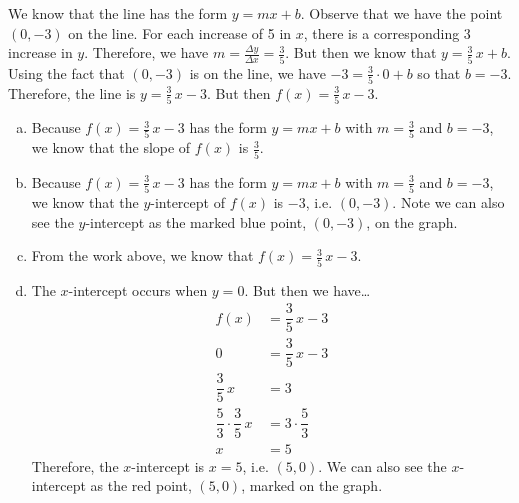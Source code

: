 \documentclass[11pt,letterpaper]{article}
\begin{document}
\sol We know that the line has the form $y= mx + b$. Observe that we have the point $(0, -3)$ on the line. For each increase of 5 in $x$, there is a corresponding 3 increase in $y$. Therefore, we have $m= \frac{\Delta y}{\Delta x}= \frac{3}{5}$. But then we know that $y= \frac{3}{5}\,x + b$. Using the fact that $(0, -3)$ is on the line, we have $-3= \frac{3}{5} \cdot 0 + b$ so that $b= -3$. Therefore, the line is $y= \frac{3}{5}\,x - 3$. But then $f(x)= \frac{3}{5}\,x - 3$. 

\begin{enumerate}[(a)]
\item  Because $f(x)= \frac{3}{5}\,x - 3$ has the form $y= mx + b$ with $m= \frac{3}{5}$ and $b= -3$, we know that the slope of $f(x)$ is $\frac{3}{5}$. \pspace

\item  Because $f(x)= \frac{3}{5}\,x - 3$ has the form $y= mx + b$ with $m= \frac{3}{5}$ and $b= -3$, we know that the $y$-intercept of $f(x)$ is $-3$, i.e. $(0, -3)$. Note we can also see the $y$-intercept as the marked blue point, $(0, -3)$, on the graph. \pspace

\item From the work above, we know that $f(x)= \frac{3}{5}\,x - 3$. \pspace

\item The $x$-intercept occurs when $y= 0$. But then we have\dots
	\[
	\begin{aligned}
	f(x)&= \dfrac{3}{5}\,x - 3 \\[0.3cm]
	0&= \dfrac{3}{5}\,x - 3 \\[0.3cm]
	\dfrac{3}{5}\,x&= 3 \\[0.3cm]
	\dfrac{5}{3} \cdot \dfrac{3}{5}\, x&= 3 \cdot \dfrac{5}{3} \\[0.3cm]
	x&= 5 
	\end{aligned}
	\]
Therefore, the $x$-intercept is $x= 5$, i.e. $(5, 0)$. We can also see the $x$-intercept as the red point, $(5, 0)$, marked on the graph. 
\end{enumerate}
\end{document}
